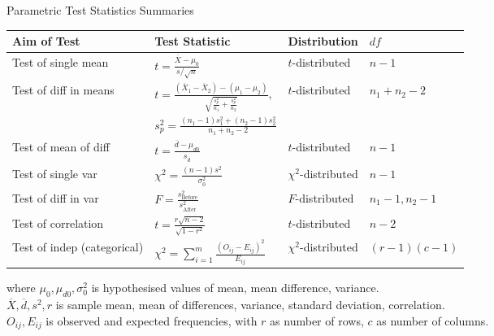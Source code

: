 \begin{flushleft}
Parametric Test Statistics Summaries
\begin{tabularx}{\textwidth}{p{12em}|X|X|X}
\hline
\rowcolor{gray!30}
Aim of Test & Test Statistic & Distribution & $df$ \\
\hline
Test of single mean & $t = \frac{\overline{X} - \mu_0}{s /\sqrt{n}}$ & $t$-distributed & $n-1$\\
\hline
Test of diff in means & $t = \frac{(\overline{X}_1 - \overline{X}_2) - (\mu_1 - \mu_2)}{\sqrt{\frac{s_p^2}{n_1} + \frac{s_p^2}{n_2}}}$, & $t$-distributed & $n_1 + n_2 -2$
 \\
& $s_p^2 = \frac{(n_1 - 1)s_1^2 + (n_2 - 1)s_2^2}{n_1 + n_2 - 2}$ & &\\
\hline
Test of mean of diff & $t = \frac{\overline{d} - \mu_{d0}}{s_{\overline{d}}}$ & $t$-distributed & $n-1$ \\
\hline
Test of single var & $\chi^2 = \frac{(n-1)s^2}{\sigma_0^2}$ & $\chi^2$-distributed & $n-1$ \\
\hline
Test of diff in var & $F = \frac{s^2_{\text{Before}}}{s^2_{\text{After}}}$ & $F$-distributed & $n_1 -1, n_2 - 1$ \\
\hline
Test of correlation & $t = \frac{r \sqrt{n-2}}{\sqrt{1-r^2}}$ & $t$-distributed & $n-2$\\
\hline
Test of indep (categorical) & $\chi^2 = \sum\limits_{i=1}^m \frac{(O_{ij} - E_{ij})^2}{E_{ij}}$ & $\chi^2$-distributed & $(r-1)(c-1)$\\
\hline
\end{tabularx}
where $\mu_0, \mu_{d0}, \sigma_0^2$ is hypothesised values of mean, mean difference, variance.\\
$\overline{X}, \overline{d}, s^2, r$ is sample mean, mean of differences, variance, standard deviation, correlation.\\
$O_{ij}, E_{ij}$ is observed and expected frequencies, with $r$ as number of rows, $c$ as number of columns.
\end{flushleft}

